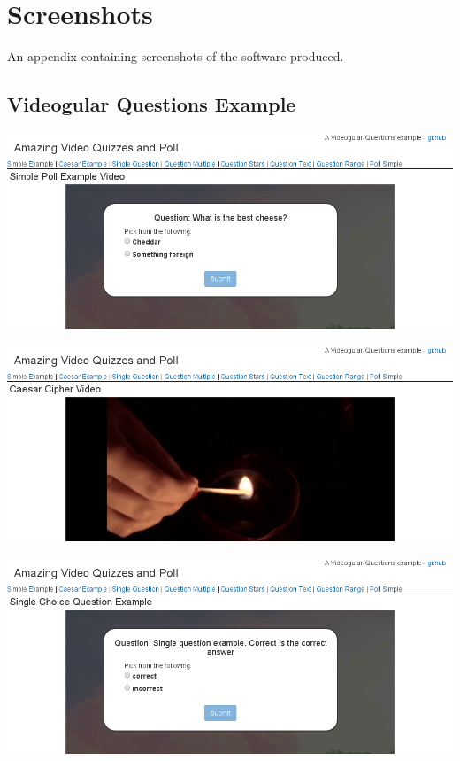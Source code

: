 \chapter{Screenshots} \label{App:Screenshots}

\begin{preamble}
	An appendix containing screenshots of the software produced.
\end{preamble}

\section{Videogular Questions Example}

\includegraphics[width=\textwidth]{screenshots/videogular-questions-example-poll-simple.png}

\includegraphics[width=\textwidth]{screenshots/videogular-questions-example-caesar-example.png}

\includegraphics[width=\textwidth]{screenshots/videogular-questions-example-question-single.png}

